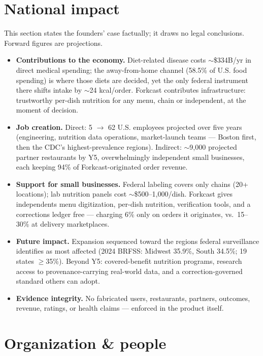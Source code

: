 \documentclass[10pt]{article}
\begin{document}
\section{National impact}

{\small\color{muted}This section states the founders' case factually; it draws no legal conclusions. Forward figures are projections.}

\begin{itemize}[leftmargin=1.4em,itemsep=3pt]
\item \textbf{Contributions to the economy.} Diet-related disease costs $\sim$\$334B/yr in direct medical spending; the away-from-home channel (58.5\% of U.S. food spending) is where those diets are decided, yet the only federal instrument there shifts intake by $\sim$24 kcal/order. Forkcast contributes infrastructure: trustworthy per-dish nutrition for any menu, chain or independent, at the moment of decision.
\item \textbf{Job creation.} Direct: 5 $\to$ 62 U.S. employees projected over five years (engineering, nutrition data operations, market-launch teams --- Boston first, then the CDC's highest-prevalence regions). Indirect: $\sim$9{,}000 projected partner restaurants by Y5, overwhelmingly independent small businesses, each keeping 94\% of Forkcast-originated order revenue.
\item \textbf{Support for small businesses.} Federal labeling covers only chains (20+ locations); lab nutrition panels cost $\sim$\$500--1{,}000/dish. Forkcast gives independents menu digitization, per-dish nutrition, verification tools, and a corrections ledger free --- charging 6\% only on orders it originates, vs.\ 15--30\% at delivery marketplaces.
\item \textbf{Future impact.} Expansion sequenced toward the regions federal surveillance identifies as most affected (2024 BRFSS: Midwest 35.9\%, South 34.5\%; 19 states $\geq$35\%). Beyond Y5: covered-benefit nutrition programs, research access to provenance-carrying real-world data, and a correction-governed standard others can adopt.
\item \textbf{Evidence integrity.} No fabricated users, restaurants, partners, outcomes, revenue, ratings, or health claims --- enforced in the product itself.
\end{itemize}

\section{Organization \& people}
\end{document}
